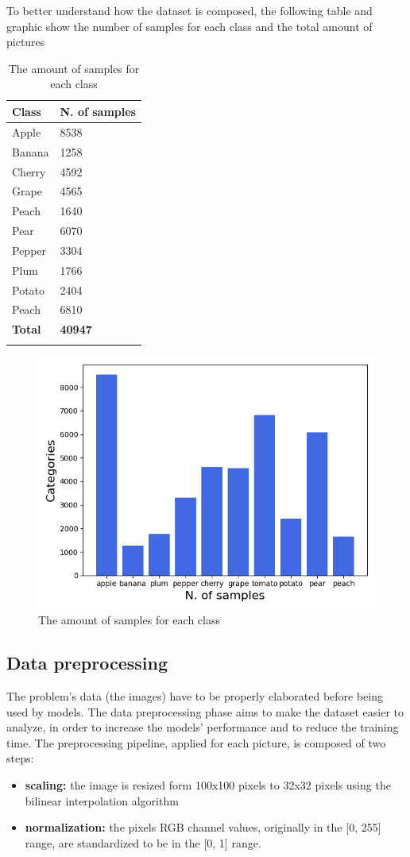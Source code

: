 To better understand how the dataset is composed, the following table
and graphic show the number of samples for each class and the total
amount of pictures

\begin{longtable}[]{@{}ll@{}}
\toprule
\textbf{Class} & \textbf{N. of samples}\tabularnewline
\midrule
\endhead
Apple & 8538\tabularnewline
Banana & 1258\tabularnewline
Cherry & 4592\tabularnewline
Grape & 4565\tabularnewline
Peach & 1640\tabularnewline
Pear & 6070\tabularnewline
Pepper & 3304\tabularnewline
Plum & 1766\tabularnewline
Potato & 2404\tabularnewline
Peach & 6810\tabularnewline
\textbf{Total} & \textbf{40947}\tabularnewline
\bottomrule
\caption{The amount of samples for each class}
\end{longtable}

\begin{figure}[h!]
\centering
\includegraphics[width=0.9\linewidth]{../images/n_samples.png}
\caption{The amount of samples for each class}
\end{figure}

\subsection{Data preprocessing}\label{header-n75}

The problem's data (the images) have to be properly elaborated before
being used by models. The data preprocessing phase aims to make the
dataset easier to analyze, in order to increase the models' performance and to
reduce the training time. The preprocessing pipeline, applied for each
picture, is composed of two steps:

\begin{itemize}
\item
  \textbf{scaling:} the image is resized form 100x100 pixels to 32x32
  pixels using the bilinear interpolation algorithm
\item
  \textbf{normalization:} the pixels RGB channel values, originally in
  the {[}0, 255{]} range, are standardized to be in the {[}0, 1{]}
  range.
\end{itemize}

